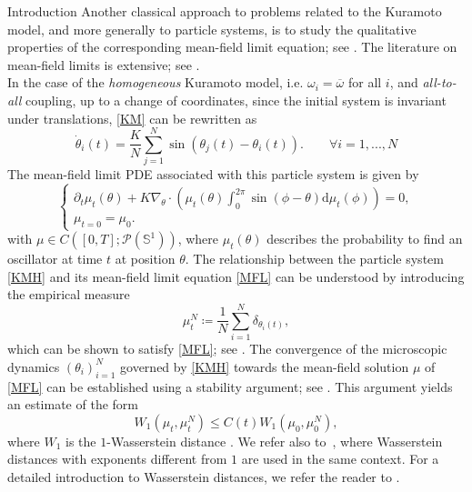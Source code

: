 \documentclass{article}
\theoremstyle{definition}
\begin{document}
\begin{section}{Introduction}
Another classical approach to problems related to the Kuramoto model, and more generally to particle systems, is to study the qualitative properties of the corresponding mean-field limit equation; see \cite{chiba2015proof}. The literature on mean-field limits is extensive; see \cite{braun1977vlasov,dobrushin1979vlasov,golse2016dynamics,jabin2018quantitative,neunzert2006approximation,serfaty2020mean,sznitman2006topics}.\\

In the case of the \textit{homogeneous} Kuramoto model, i.e. $\omega_i=\overline{\omega}$ for all $i$, and \textit{all-to-all} coupling, up to a change of coordinates, since the initial system is invariant under translations, \eqref{KM} can be rewritten as
\begin{equation}\label{KMH}
    \dot{\theta}_i(t)=\frac{K}{N}\sum_{j=1}^N\sin{(\theta_j(t)-\theta_i(t))}.\qquad\forall i=1,...,N\tag{KMH}
\end{equation}
The mean-field limit PDE associated with this particle system is given by
\begin{equation}\label{MFL}
\begin{cases}\tag{KMFL}
\displaystyle
    \partial_t \mu_t(\theta)+K\nabla_\theta\cdot\left(\mu_t(\theta)\int_{0}^{2\pi}\sin(\phi-\theta)\text{d}\mu_t(\phi)\right)=0,\\
    \mu_{t=0}=\mu_0.
\end{cases}
\end{equation}
with $\mu \in C([0,T]; \mathcal{P}(\mathbb{S}^1))$, where $\mu_t(\theta)$ describes the probability to find an oscillator at time $t$ at position $\theta$. The relationship between the particle system \eqref{KMH} and its mean-field limit equation \eqref{MFL} can be understood by introducing the empirical measure
$$\mu_t^N\coloneqq\frac{1}{N}\sum_{i=1}^N\delta_{\theta_i(t)},$$
which can be shown to satisfy \eqref{MFL}; see \cite[Th. 1.3.1]{golse2016dynamics}. The convergence of the microscopic dynamics $(\theta_i)_{i=1}^N$ governed by \eqref{KMH} towards the mean-field solution $\mu$ of \eqref{MFL} can be established using a stability argument; see \cite{golse2016dynamics,dobrushin1979vlasov}. This argument yields an estimate of the form
\begin{equation}\label{MFL_rate_conv}
    W_1(\mu_t,\mu_t^N)\leq C(t)W_1(\mu_0,\mu_0^N),
\end{equation}
where $W_1$ is the $1$-Wasserstein distance \cite{dobrushin1979vlasov}. We refer also to~\cite{loeper2006uniqueness}, where Wasserstein distances with exponents different from $1$ are used in the same context. For a detailed introduction to Wasserstein distances, we refer the reader to \cite{villani2008optimal}.\\


\end{section}
\end{document}
